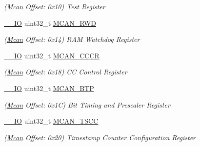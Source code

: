 \begin{DoxyCompactItemize}
\begin{DoxyCompactList}\small\item\em (\mbox{\hyperlink{structMcan}{Mcan}} Offset\+: 0x10) Test Register \end{DoxyCompactList}\item 
\mbox{\label{structMcan_a755d77fa581e283242ed6fac9506d7ae}} 
\mbox{\hyperlink{core__cm7_8h_aec43007d9998a0a0e01faede4133d6be}{\+\_\+\+\_\+\+IO}} uint32\+\_\+t \mbox{\hyperlink{structMcan_a755d77fa581e283242ed6fac9506d7ae}{M\+C\+A\+N\+\_\+\+R\+WD}}
\begin{DoxyCompactList}\small\item\em (\mbox{\hyperlink{structMcan}{Mcan}} Offset\+: 0x14) R\+AM Watchdog Register \end{DoxyCompactList}\item 
\mbox{\label{structMcan_ac56caf1c99c0eb50695882995a41915e}} 
\mbox{\hyperlink{core__cm7_8h_aec43007d9998a0a0e01faede4133d6be}{\+\_\+\+\_\+\+IO}} uint32\+\_\+t \mbox{\hyperlink{structMcan_ac56caf1c99c0eb50695882995a41915e}{M\+C\+A\+N\+\_\+\+C\+C\+CR}}
\begin{DoxyCompactList}\small\item\em (\mbox{\hyperlink{structMcan}{Mcan}} Offset\+: 0x18) CC Control Register \end{DoxyCompactList}\item 
\mbox{\label{structMcan_aa8c7ac7b950c929e7888262a646ed214}} 
\mbox{\hyperlink{core__cm7_8h_aec43007d9998a0a0e01faede4133d6be}{\+\_\+\+\_\+\+IO}} uint32\+\_\+t \mbox{\hyperlink{structMcan_aa8c7ac7b950c929e7888262a646ed214}{M\+C\+A\+N\+\_\+\+B\+TP}}
\begin{DoxyCompactList}\small\item\em (\mbox{\hyperlink{structMcan}{Mcan}} Offset\+: 0x1C) Bit Timing and Prescaler Register \end{DoxyCompactList}\item 
\mbox{\label{structMcan_af79679f70d569f298b95a27617abb506}} 
\mbox{\hyperlink{core__cm7_8h_aec43007d9998a0a0e01faede4133d6be}{\+\_\+\+\_\+\+IO}} uint32\+\_\+t \mbox{\hyperlink{structMcan_af79679f70d569f298b95a27617abb506}{M\+C\+A\+N\+\_\+\+T\+S\+CC}}
\begin{DoxyCompactList}\small\item\em (\mbox{\hyperlink{structMcan}{Mcan}} Offset\+: 0x20) Timestamp Counter Configuration Register \end{DoxyCompactList}\item 

\end{DoxyCompactItemize}
